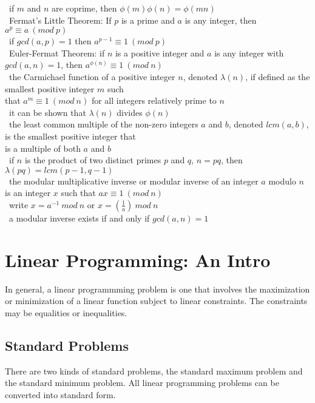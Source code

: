 \documentclass[10pt,letterpaper]{scrartcl}
\newcommand{\tbul}{\textbullet}
\newcommand{\tend}{\>\textendash}
\begin{document}
\begin{tabbing}
\begin{tabbing}
\tbul\ if $m$ and $n$ are coprime, then $\phi (m)\phi (n)=\phi (mn)$ \\
\tbul\ Fermat's Little Theorem: If $p$ is a prime and $a$ is any integer, then $a^p\equiv a\ (mod\ p)$ \\
    \tend\ if $gcd(a, p)=1$ then $a^{p-1}\equiv 1\ (mod\ p)$ \\
\tbul\ Euler-Fermat Theorem: if $n$ is a positive integer and $a$ is any integer with $gcd(a,n)=1$, then $a^{\phi (n)}\equiv 1\ (mod\ n)$ \\
\tbul\ the Carmichael function of a positive integer $n$, denoted $\lambda (n)$, if defined as the smallest positive integer $m$ such \\ that $a^m\equiv 1\ (mod\ n)$ for all integers relatively prime to $n$ \\
    \tend\ it can be shown that $\lambda (n)$ divides $\phi (n)$ \\
\tbul\ the least common multiple of the non-zero integers $a$ and $b$, denoted $lcm(a,b)$, is the smallest positive integer that \\ is a multiple of both $a$ and $b$ \\
\tbul\ if $n$ is the product of two distinct primes $p$ and $q$, $n=pq$, then $\lambda (pq)=lcm(p-1, q-1)$ \\
\tbul\ the modular multiplicative inverse or modular inverse of an integer $a$ modulo $n$ is an integer $x$ such that $ax\equiv 1\ (mod\ n)$ \\
    \tend\ write $x = a^{-1}\ mod\ n$ or $x=(\frac{1}{a})\ mod\ n$ \\
    \tend\ a modular inverse exists if and only if $gcd(a, n)=1$ \end{tabbing}

\newpage\section{Linear Programming: An Intro}
In general, a linear programmming problem is one that involves the maximization or minimization of a linear function subject to linear constraints. The constraints may be equalities or inequalities. 
\subsection{Standard Problems}
There are two kinds of standard problems, the standard maximum problem and the standard minimum problem. All linear programming problems can be converted into standard form. 

\end{tabbing}
\end{document}
